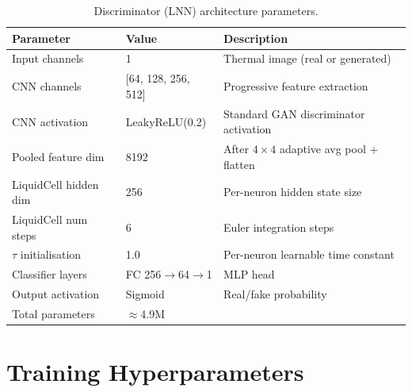 \begin{table}[htbp]
\centering
\caption{Discriminator (LNN) architecture parameters.}
\label{tab:app_disc}
\begin{tabular}{lll}
\toprule
\textbf{Parameter} & \textbf{Value} & \textbf{Description} \\
\midrule
Input channels & 1 & Thermal image (real or generated) \\
CNN channels & [64, 128, 256, 512] & Progressive feature extraction \\
CNN activation & LeakyReLU(0.2) & Standard GAN discriminator activation \\
Pooled feature dim & 8192 & After $4\times4$ adaptive avg pool + flatten \\
LiquidCell hidden dim & 256 & Per-neuron hidden state size \\
LiquidCell num steps & 6 & Euler integration steps \\
$\tau$ initialisation & 1.0 & Per-neuron learnable time constant \\
Classifier layers & FC 256$\to$64$\to$1 & MLP head \\
Output activation & Sigmoid & Real/fake probability \\
Total parameters & $\approx$4.9M & \\
\bottomrule
\end{tabular}
\end{table}

\section{Training Hyperparameters}

